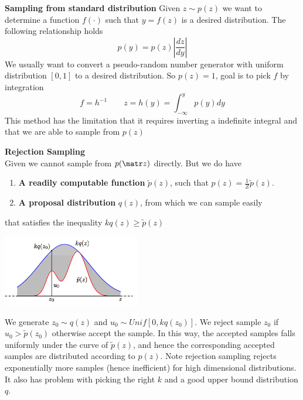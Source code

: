 \documentclass[11pt]{article}
\begin{document}
\begin{defn*}
    \textbf{Sampling from standard distribution} Given $z \sim p(z)$ we want to determine a function $f(\cdot)$ such that $y = f(z)$ is a desired distribution. The following relationship holds
    \[
        p(y) = p(z) \left| \frac{dz}{dy} \right|    
    \]
    We usually want to convert a pseudo-random number generator with uniform distribution $[0,1]$ to a desired distribution. So $p(z) = 1$, goal is to pick $f$ by integration
    \[
        f = h^{-1}
        \qquad 
        z = h(y) = \int_{-\infty}^y p(y) dy
    \]
    This method has the limitation that it requires inverting a indefinite integral and that we are able to sample from $p(z)$
\end{defn*}

\begin{defn*}
    \textbf{Rejection Sampling} \\ 
    Given we cannot sample from $p(\bz)$ directly. But we do have 
    \begin{enumerate}
        \item \textbf{A readily computable function} $\tilde{p}(z)$, such that $p(z) = \textstyle\frac{1}{Z} \tilde{p}(z)$. 
        \item \textbf{A proposal distribution} $q(z)$, from which we can sample easily 
    \end{enumerate}
    that satisfies the inequality $kq(z) \geq \tilde{p}(z)$
    \begin{center}
        \includegraphics[width=6cm]{rejection_sampling.png}
    \end{center}
    We generate $z_0 \sim q(z)$ and $u_0 \sim Unif[0, kq(z_0)]$. We reject sample $z_0$ if $u_0 > \tilde{p}(z_0)$ otherwise accept the sample. In this way, the accepted samples falls uniformly under the curve of $\tilde{p}(z)$, and hence the corresponding accepted samples are distributed according to $p(z)$. Note rejection sampling rejects exponentially more samples (hence inefficient) for high dimensional distributions. It also has problem with picking the right $k$ and a good upper bound distribution $q$. 
\end{defn*}
\end{document}
